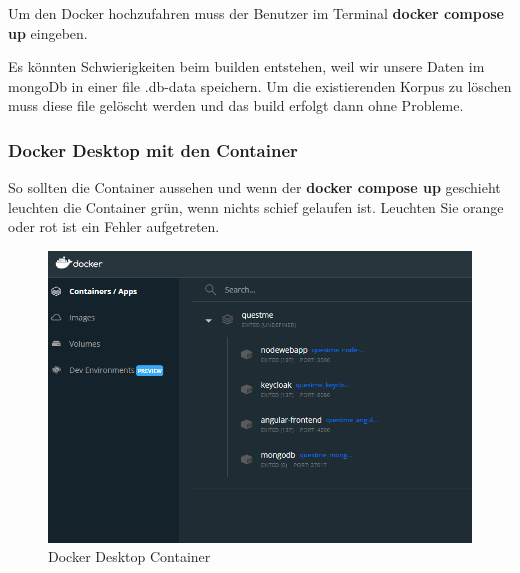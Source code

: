 \noindent Um den Docker hochzufahren muss der Benutzer im Terminal \textbf{docker compose up} eingeben.\newline

\noindent Es könnten Schwierigkeiten beim builden entstehen, weil wir unsere Daten im mongoDb in einer file 
.db-data speichern. Um die existierenden Korpus zu löschen muss diese file gelöscht werden und das build erfolgt dann ohne Probleme.

\subsubsection{Docker Desktop mit den Container}
So sollten die Container aussehen und wenn der \textbf{docker compose up} geschieht leuchten die Container grün, wenn nichts 
schief gelaufen ist. Leuchten Sie orange oder rot ist ein Fehler aufgetreten.

\begin{figure}[H]
    \centering
    \includegraphics[width=1.0\textwidth]{bilder/installationshandbuch/Docker_Container.PNG}
    \caption{Docker Desktop Container}
    \label{fig:Docker_Desktop_Container}
\end{figure}

